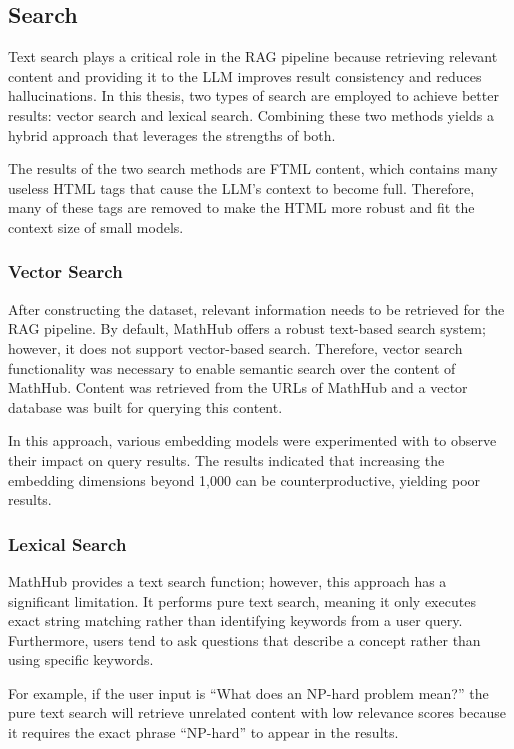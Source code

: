 \subsection{Search}
Text search plays a critical role in the RAG pipeline because retrieving relevant content and providing it to the LLM improves result consistency and reduces hallucinations.
In this thesis, two types of search are employed to achieve better results: vector search and lexical search.
Combining these two methods yields a hybrid approach that leverages the strengths of both.

The results of the two search methods are FTML content, which contains many useless HTML tags that cause the LLM's context to become full. Therefore, many of these tags are removed to make the HTML more robust and fit the context size of small models.
\subsubsection{Vector Search}
After constructing the dataset, relevant information needs to be retrieved for the RAG pipeline.
By default, MathHub offers a robust text-based search system; however, it does not support vector-based search.
Therefore, vector search functionality was necessary to enable semantic search over the content of MathHub.
Content was retrieved from the URLs of MathHub and a vector database was built for querying this content.

In this approach, various embedding models were experimented with to observe their impact on query results.
The results indicated that increasing the embedding dimensions beyond 1,000 can be counterproductive, yielding poor results.

\subsubsection{Lexical Search}
MathHub provides a text search function; however, this approach has a significant limitation. It performs pure text search,
meaning it only executes exact string matching rather than identifying keywords from a user query.
Furthermore, users tend to ask questions that describe a concept rather than using specific keywords.

For example, if the user input is ``What does an NP-hard problem mean?'' the pure text search will retrieve
unrelated content with low relevance scores because it requires the exact phrase ``NP-hard'' to appear in the results.

